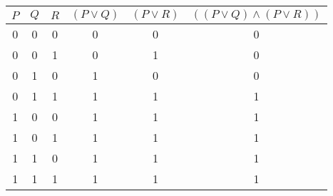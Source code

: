 \begin{tabular}{|c|c|c||c|c|c|}
\hline
$ P $ & $ Q $ & $ R $ & $ (P \vee Q) $ & $ (P \vee R) $ & $ ((P \vee Q) \wedge (P \vee R)) $ \\
\hline
0 & 0 & 0 & 0 & 0 & 0 \\
0 & 0 & 1 & 0 & 1 & 0 \\
0 & 1 & 0 & 1 & 0 & 0 \\
0 & 1 & 1 & 1 & 1 & 1 \\
1 & 0 & 0 & 1 & 1 & 1 \\
1 & 0 & 1 & 1 & 1 & 1 \\
1 & 1 & 0 & 1 & 1 & 1 \\
1 & 1 & 1 & 1 & 1 & 1 \\
\hline
\end{tabular}
